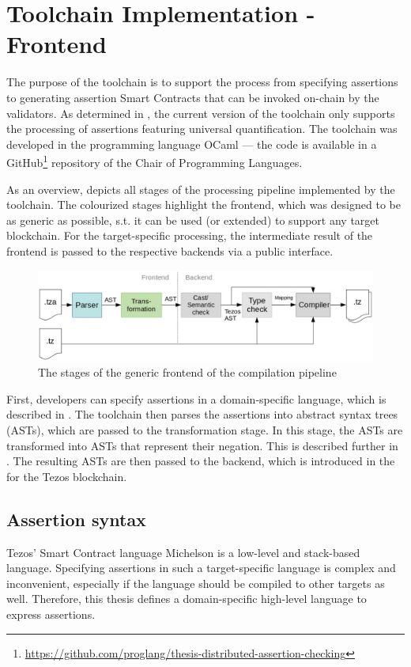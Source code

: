 \chapter{Toolchain Implementation - Frontend}\label{chap:offline}
The purpose of the toolchain is to support the process from specifying assertions to generating assertion Smart Contracts that can be invoked on-chain by the validators. As determined in , the current version of the toolchain only supports the processing of assertions featuring universal quantification. The toolchain was developed in the programming language OCaml \cite{ocaml_docs} --- the code is available in a GitHub\footnote{\url{https://github.com/proglang/thesis-distributed-assertion-checking}} repository of the Chair of Programming Languages.

As an overview,  depicts all stages of the processing pipeline implemented by the toolchain. The colourized stages highlight the frontend, which was designed to be as generic as possible, s.t. it can be used (or extended) to support any target blockchain. For the target-specific processing, the intermediate result of the frontend is passed to the respective backends via a public interface.

\begin{figure}[h]
\includegraphics[width=\linewidth]{figures/3-offline/pipeline_frontend}
\caption{The stages of the generic frontend of the compilation pipeline}
\label{fig:pipeline_frontend}
\end{figure}

First, developers can specify assertions in a domain-specific language, which is described in . The toolchain then parses the assertions into abstract syntax trees (ASTs), which are passed to the transformation stage. In this stage, the ASTs are transformed into ASTs that represent their negation. This is described further in . The resulting ASTs are then passed to the backend, which is introduced in the  for the Tezos blockchain.

\section{Assertion syntax}\label{sec:syntax}
Tezos' Smart Contract language Michelson is a low-level and stack-based language. Specifying assertions in such a target-specific language is complex and inconvenient, especially if the language should be compiled to other targets as well. Therefore, this thesis defines a domain-specific high-level language to express assertions. 

